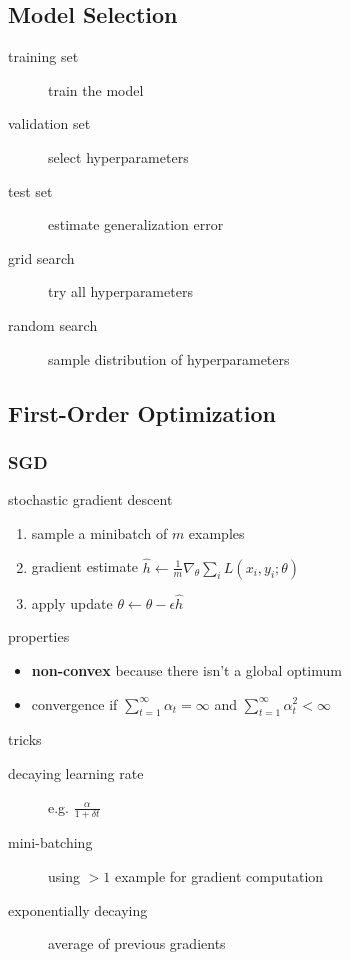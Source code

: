 \documentclass[]{article}
\begin{document}
\subsection{Model Selection}%
\label{sub:model_selection}

\begin{description}
    \item[training set] train the model
    \item[validation set] select hyperparameters
    \item[test set] estimate generalization error
    \item[grid search] try all hyperparameters
    \item[random search] sample distribution of hyperparameters
\end{description}

\subsection{First-Order Optimization}%
\label{sub:optimization}

\subsubsection{SGD}%
\label{ssub:sgd}

stochastic gradient descent
\begin{enumerate}
    \item sample a minibatch of $m$ examples
    \item gradient estimate $\hat h \gets \frac{1}{m} \nabla_\theta \sum_i L(x_i, y_i; \theta)$
    \item apply update $\theta \gets \theta - \epsilon \hat h$
\end{enumerate}

properties
\begin{itemize}
    \item \textbf{non-convex} because there isn't a global optimum
    \item convergence if $\sum_{t=1}^\infty \alpha_t = \infty$ and $\sum_{t=1}^\infty \alpha_t^2 < \infty$
\end{itemize}

tricks
\begin{description}
    \item[decaying learning rate] e.g. $ \frac{\alpha}{1 + \delta t}$
    \item[mini-batching] using $>1$ example for gradient computation
    \item[exponentially decaying] average of previous gradients
\end{description}
\end{document}
